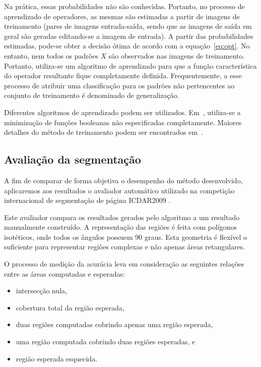 \documentclass[10pt,a4paper,conference]{IEEEtran}
\begin{document}
Na prática, essas probabilidades não são conhecidas. Portanto, no
processo de aprendizado de operadores, as mesmas são estimadas a partir
de imagens de treinamento (pares de imagens entrada-saída, sendo que
as imagens de saída em geral são geradas editando-se a imagem de
entrada). A partir das probabilidades estimadas, pode-se obter a
decisão ótima de acordo com a equação~\ref{eq:opt}. No entanto, nem
todos os padrões $X$ são observados nas imagens de
treinamento. Portanto, utiliza-se um algoritmo de aprendizado para que
a função característica do operador resultante fique completamente
definida. Frequentemente, a esse processo de atribuir uma
classificação para os padrões não pertencentes ao conjunto de
treinamento é denominado de generalização.

Diferentes algoritmos de aprendizado podem ser
utilizados. Em~\cite{Tomita:1996:PrAuMa}, utiliza-se a minimização de
funções booleanas não especificadas completamente. Maiores detalhes do
método de treinamento podem ser encontrados em~\cite{Nina:2010a}.


\subsection{Avaliação da segmentação}

A fim de comparar de forma objetiva o desempenho do método
desenvolvido, aplicaremos aos resultados o avaliador automático
utilizado na competição internacional de segmentação de página
ICDAR2009 \cite{DBLP:conf/icdar/2009}.

Este avaliador compara os resultados gerados pelo algoritmo a um
resultado manualmente construído. A representação das regiões é feita
com polígonos isotéticos, onde todos os ângulos possuem 90 graus. Esta
geometria é flexível o suficiente para representar regiões complexas e
não apenas áreas retangulares.


O processo de medição da acurácia leva em consideração as seguintes
relações entre as áreas computadas e esperadas:

\begin{itemize}
	\item intersecção nula,
	\item cobertura total da região esperada,
	\item duas regiões computadas cobrindo apenas uma região esperada,
	\item uma região computada cobrindo duas regiões esperadas, e
	\item região esperada esquecida.
\end{itemize}
\end{document}
